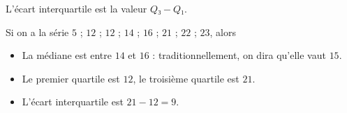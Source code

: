 \documentclass[
	classe=$2^{de}$
]{coursclass}
\begin{document}
\begin{definition}
	L'écart interquartile est la valeur $Q₃ - Q₁$.
\end{definition}

\begin{exemple}
	Si on a la série $5$ ; $12$ ; $12$ ; $14$ ; $16$ ; $21$ ; $22$ ; $23$, alors
	\begin{itemize}
		\item La médiane est entre $14$ et $16$ : traditionnellement, on dira qu'elle vaut $15$.
		\item Le premier quartile est $12$, le troisième quartile est $21$.
		\item L'écart interquartile est $21 - 12 = 9$.
	\end{itemize}
\end{exemple}
\end{document}
